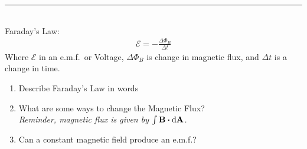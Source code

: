 \documentclass[11pt]{article}
\begin{document}
\Large

\medskip\hrule\bigskip\bigskip
{}
\\Faraday's Law:
\begin{align*}
  \mathcal{E}=-\frac{\Delta \Phi_B}{\Delta t}
\end{align*}
Where $\mathcal{E}$ in an e.m.f.\ or Voltage, $\Delta\Phi_B$ is change in magnetic flux, and $\Delta t$ is a change in time.
\begin{enumerate}
\item Describe Faraday's Law in words
  \vspace*{0.2\textheight}
\item What are some ways to change the Magnetic Flux? \\\emph{Reminder, magnetic flux is given by $\int\vb{B}\vdot\dd{\vb{A}}$.}
  \vspace*{0.2\textheight}
\item Can a constant magnetic field produce an e.m.f.?
  
\end{enumerate}
\end{document}
